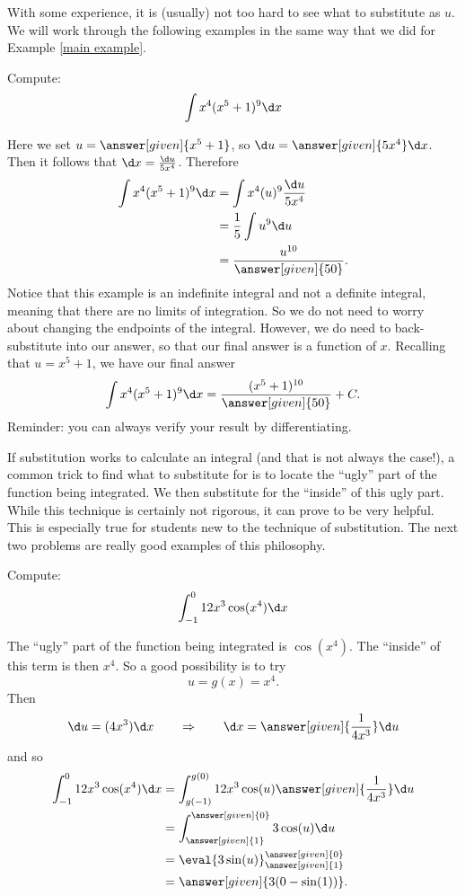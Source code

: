 \documentclass{ximera}
\begin{document}
With some experience, it is (usually) not too hard to see what to
substitute as $u$.  We will work through the following examples in the
same way that we did for Example \ref{main example}.
\begin{example}
Compute:
\[
\int x^4(x^5+1)^{9} \d x
\]
\begin{explanation}
Here we set $u =  \answer[given]{x^5+1}$, so $\d u =  \answer[given]{5x^4} \d x$.  Then
it follows that $\d x=\frac{\d u}{5x^4}$. Therefore
\begin{align*}
  \int x^4(x^5+1)^{9} \d x &= \int x^4 (u)^{9} \frac{\d u}{5x^4} \\
  &= \frac{1}{5} \int u^{9} \d u\\
&=\frac{u^{10}}{ \answer[given]{50}}.
\end{align*}
Notice that this example is an indefinite integral and not a definite
integral, meaning that there are no limits of integration.  So we do
not need to worry about changing the endpoints of the integral.  However,
we do need to back-substitute into our answer, so that our final
answer is a function of $x$.  Recalling that $u= x^5+1$, we have
our final answer
\[
\int x^4(x^5+1)^{9} \d x= \frac{(x^5+1)^{10}}{\answer[given]{50}}+C.
\]
Reminder: you can always verify your result by differentiating.

\end{explanation}
\end{example}


If substitution works to calculate an integral (and that is not always the
case!), a common trick to find what to substitute for is to locate the
``ugly'' part of the function being integrated.  We then substitute
for the ``inside'' of this ugly part.  While this technique is
certainly not rigorous, it can prove to be very helpful.  This is
especially true for students new to the technique of substitution.
The next two problems are really good examples of this philosophy.

\begin{example}
Compute:
\[
\int_{-1}^0 12x^3 \cos({x^4}) \d x
\]
\begin{explanation}
The ``ugly'' part of the function being integrated is $\cos({x^4})$.  The
``inside'' of this term is then $x^4$.  So a good possibility is to
try
\[
u =g(x)= x^4.
\]
Then
\[
\d u = (4x^3) \d x 	\qquad	\Rightarrow	\qquad	\d x = \answer[given]{\frac{1}{4x^3}} \d u
\]
and so
\begin{align*}
\int_{-1}^0 12x^3 \cos({x^4}) \d x &= \int_{g(-1)}^{g(0)} 12 x^3 \cos({u}) \answer[given]{\frac{1}{4x^3}} \d u  \\
&= \int_{\answer[given]{1}}^{\answer[given]{0}} 3 \cos({u}) \d u  \\
&= \eval{3\sin({u})}_{\answer[given]{1}}^{\answer[given]{0}}  \\
&= \answer[given]{3(0-\sin({1}))}.
\end{align*}
\end{explanation}
\end{example}
\end{document}
